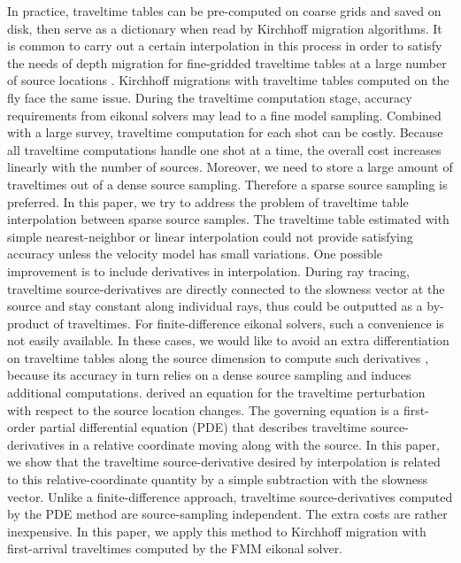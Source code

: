 In practice, traveltime tables can be pre-computed on coarse grids and saved on disk, then serve as 
a dictionary when read by Kirchhoff migration algorithms. It is common to carry out a certain interpolation 
in this process in order to satisfy the needs of depth migration for fine-gridded traveltime tables 
at a large number of source locations \cite[]{mendes,vanelle,alkhalifah5}. Kirchhoff migrations with 
traveltime tables computed on the fly face the same issue. During the traveltime computation stage, 
accuracy requirements from eikonal solvers may lead to a fine model sampling. Combined with a large 
survey, traveltime computation for each shot can be costly. Because all traveltime computations handle 
one shot at a time, the overall cost increases linearly with the number of sources. Moreover, we need 
to store a large amount of traveltimes out of a dense source sampling. Therefore a sparse source 
sampling is preferred. In this paper, we try to address the problem of traveltime table interpolation 
between sparse source samples. The traveltime table estimated with simple nearest-neighbor or linear 
interpolation could not provide satisfying accuracy unless the velocity model has small variations. 
One possible improvement is to include derivatives in interpolation. During ray tracing, traveltime 
source-derivatives are directly connected to the slowness vector at the source and stay constant along 
individual rays, thus could be outputted as a by-product of traveltimes. For finite-difference eikonal 
solvers, such a convenience is not easily available. In these cases, we would like to avoid an extra 
differentiation on traveltime tables along the source dimension to compute such derivatives \cite[]{vanelle}, 
because its accuracy in turn relies on a dense source sampling and induces additional computations. 
\cite{alkhalifah3} derived an equation for the traveltime perturbation with respect to the source 
location changes. The governing equation is a first-order partial differential equation (PDE) that 
describes traveltime source-derivatives in a relative coordinate moving along with the source. In 
this paper, we show that the traveltime source-derivative desired by interpolation is related to this 
relative-coordinate quantity by a simple subtraction with the slowness vector. Unlike a finite-difference 
approach, traveltime source-derivatives computed by the PDE method are source-sampling independent. 
The extra costs are rather inexpensive. In this paper, we apply this method to Kirchhoff migration 
with first-arrival traveltimes computed by the FMM eikonal solver.

